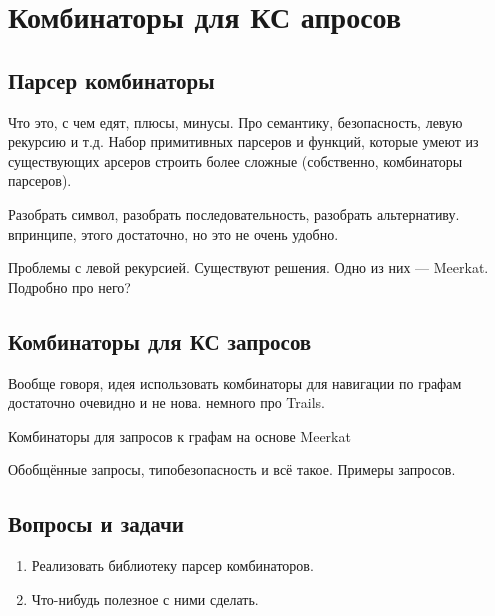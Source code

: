 \section{Комбинаторы для КС апросов}

\subsection{Парсер комбинаторы}

Что это, с чем едят, плюсы, минусы. Про семантику, безопасность, левую рекурсию и т.д.
Набор примитивных парсеров и функций, которые умеют из существующих арсеров строить более сложные (собственно, комбинаторы парсеров).

Разобрать символ, разобрать последовательность, разобрать альтернативу. впринципе, этого достаточно, но это не очень удобно.

Проблемы с левой рекурсией.
Существуют решения. Одно из них --- Meerkat.
Подробно про него?

\subsection{Комбинаторы для КС запросов}

Вообще говоря, идея использовать комбинаторы для навигации по графам достаточно очевидно и не нова.
немного про Trails.

Комбинаторы для запросов к графам на основе Meerkat~\cite{Verbitskaia:2018:PCC:3241653.3241655}

Обобщённые запросы, типобезопасность и всё такое.
Примеры запросов.

\subsection{Вопросы и задачи}
\begin{enumerate}
  \item Реализовать библиотеку парсер комбинаторов.
  \item Что-нибудь полезное с ними сделать.
\end{enumerate}
